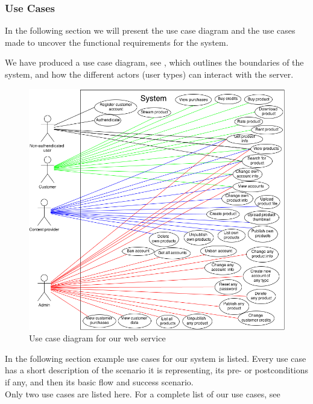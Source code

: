 \subsubsection{Use Cases}
In the following section we will present the use case diagram and the use cases made to uncover the functional requirements for the system.

We have produced a use case diagram, see , which outlines the boundaries of the system, and how the different actors (user types) can interact with the server. 
\begin{figure}[h]
\centering
\includegraphics[scale=0.5]{illustrations/UseCaseDiagram.png}
\caption{Use case diagram for our web service}
\label{useCaseImg}
\end{figure}

In the following section example use cases for our system is listed. Every use case has a short description of the scenario it is representing, its pre- or postconditions if any, and then its basic flow and success scenario.\\
Only two use cases are listed here. For a complete list of our use cases, see 

